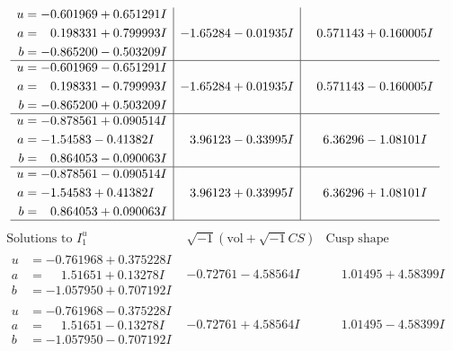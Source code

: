 \documentclass[1p]{elsarticle_modified}
\theoremstyle{definition}
\newcommand{\I}{\sqrt{-1}}
\begin{document}
$$\begin{array}{c|c|c}
\begin{aligned}
u &= -0.601969 + 0.651291 I \\
a &= \phantom{-}0.198331 + 0.799993 I \\
b &= -0.865200 - 0.503209 I\end{aligned}
 & -1.65284 - 0.01935 I & \phantom{-}0.571143 + 0.160005 I \\ \hline\begin{aligned}
u &= -0.601969 - 0.651291 I \\
a &= \phantom{-}0.198331 - 0.799993 I \\
b &= -0.865200 + 0.503209 I\end{aligned}
 & -1.65284 + 0.01935 I & \phantom{-}0.571143 - 0.160005 I \\ \hline\begin{aligned}
u &= -0.878561 + 0.090514 I \\
a &= -1.54583 - 0.41382 I \\
b &= \phantom{-}0.864053 - 0.090063 I\end{aligned}
 & \phantom{-}3.96123 - 0.33995 I & \phantom{-}6.36296 - 1.08101 I \\ \hline\begin{aligned}
u &= -0.878561 - 0.090514 I \\
a &= -1.54583 + 0.41382 I \\
b &= \phantom{-}0.864053 + 0.090063 I\end{aligned}
 & \phantom{-}3.96123 + 0.33995 I & \phantom{-}6.36296 + 1.08101 I\\
 \hline 
 \end{array}$$\newpage$$\begin{array}{c|c|c}  
\text{Solutions to }I^u_{1}& \I (\text{vol} + \sqrt{-1}CS) & \text{Cusp shape}\\
 \hline 
\begin{aligned}
u &= -0.761968 + 0.375228 I \\
a &= \phantom{-}1.51651 + 0.13278 I \\
b &= -1.057950 + 0.707192 I\end{aligned}
 & -0.72761 - 4.58564 I & \phantom{-}1.01495 + 4.58399 I \\ \hline\begin{aligned}
u &= -0.761968 - 0.375228 I \\
a &= \phantom{-}1.51651 - 0.13278 I \\
b &= -1.057950 - 0.707192 I\end{aligned}
 & -0.72761 + 4.58564 I & \phantom{-}1.01495 - 4.58399 I \\ \hline\begin{aligned}

\end{aligned}
\end{array}$$
\end{document}
